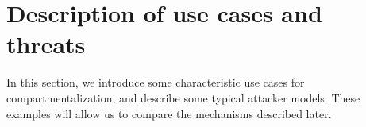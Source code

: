 


\section{Description of use cases and threats}
\label{sec:compreview:usecases}
In this section, we introduce some characteristic use cases for 
compartmentalization, and 
describe some typical attacker models.
These examples will allow us to compare the mechanisms described later.

